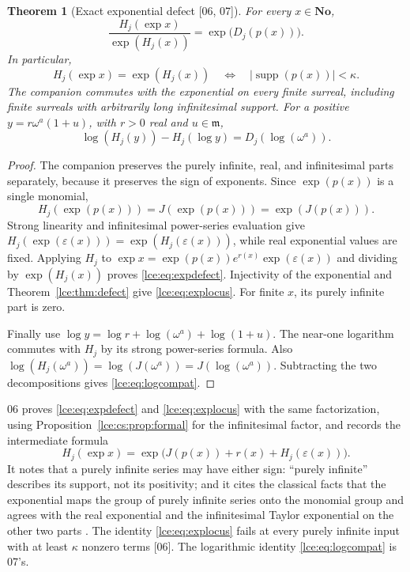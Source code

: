 \documentclass[11pt,letterpaper]{article}
\numberwithin{equation}{section}
\newtheorem{theorem}{Theorem}[section]
\theoremstyle{definition}
\theoremstyle{remark}
\newcommand{\No}{\mathbf{No}}
\newcommand{\supp}{\operatorname{supp}}
\newcommand{\eps}{\varepsilon}
\newcommand{\abs}[1]{\lvert#1\rvert}
\newcommand{\infideal}{\mathfrak m}
\newcommand{\thref}[1]{Theorem~\ref{#1}}
\newcommand{\prref}[1]{Proposition~\ref{#1}}
\newcommand{\src}[1]{\textup{\textsf{\small[#1]}}}%
\begin{document}
\begin{theorem}[Exact exponential defect \src{06, 07}]\label{lce:thm:expdefect}
For every $x\in\No$,
\begin{equation}\label{lce:eq:expdefect}
 \frac{H_j(\exp x)}{\exp(H_j(x))}
      =\exp\bigl(D_j(p(x))\bigr).
\end{equation}
In particular,
\begin{equation}\label{lce:eq:explocus}
 H_j(\exp x)=\exp(H_j(x))
    \quad\Longleftrightarrow\quad
 \abs{\supp(p(x))}<\kappa.
\end{equation}
The companion commutes with the exponential on every finite surreal,
including finite surreals with arbitrarily long infinitesimal support.
For a positive $y=r\omega^a(1+u)$, with $r>0$ real and $u\in\infideal$,
\begin{equation}\label{lce:eq:logcompat}
 \log(H_j(y))-H_j(\log y)=D_j(\log(\omega^a)).
\end{equation}
\end{theorem}
\begin{proof}
The companion preserves the purely infinite, real, and infinitesimal
parts separately, because it preserves the sign of exponents. Since
$\exp(p(x))$ is a single monomial,
\[
 H_j(\exp(p(x)))=J(\exp(p(x)))=\exp(J(p(x))).
\]
Strong linearity and infinitesimal power-series evaluation give
$H_j(\exp(\eps(x)))=\exp(H_j(\eps(x)))$, while real exponential
values are fixed. Applying $H_j$ to
$\exp x=\exp(p(x))e^{r(x)}\exp(\eps(x))$ and dividing by
$\exp(H_j(x))$ proves \eqref{lce:eq:expdefect}. Injectivity of the
exponential and \thref{lce:thm:defect} give \eqref{lce:eq:explocus}.
For finite $x$, its purely infinite part is zero.

Finally use
$\log y=\log r+\log(\omega^a)+\log(1+u)$.
The near-one logarithm commutes with $H_j$ by its strong power-series
formula. Also
$\log(H_j(\omega^a))=\log(J(\omega^a))=J(\log(\omega^a))$.
Subtracting the two decompositions gives \eqref{lce:eq:logcompat}.
\end{proof}
06 proves \eqref{lce:eq:expdefect} and \eqref{lce:eq:explocus} with the
same factorization, using \prref{lce:cs:prop:formal} for the infinitesimal
factor, and records the intermediate formula
\begin{equation}\label{lce:cs:eq:exp-formula}
 H_j(\exp x)=\exp\bigl(J(p(x))+r(x)+H_j(\eps(x))\bigr).
\end{equation}
It notes that a purely infinite series may have either sign: ``purely
infinite'' describes its support, not its positivity; and it cites the
classical facts that the exponential maps the group of purely infinite
series onto the monomial group and agrees with the real exponential and the
infinitesimal Taylor exponential on the other two parts
\cite{Gonshor,BKMM}. The identity
\eqref{lce:eq:explocus} fails at every purely infinite input with at least
$\kappa$ nonzero terms \src{06}. The logarithmic identity
\eqref{lce:eq:logcompat} is 07's.
\end{document}
